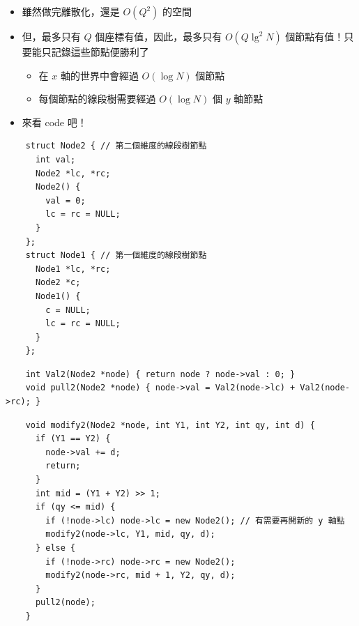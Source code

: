 \documentclass[standalone]{beamer}
\begin{document}
\begin{frame}[fragile]{}
  \begin{itemize}    
    \item 雖然做完離散化，還是 $O(Q^2)$ 的空間
    \item 但，最多只有 $Q$ 個座標有值，因此，最多只有 $O(Q \lg^2 N)$ 個節點有值！只要能只記錄這些節點便勝利了
    \begin{itemize}
      \item 在 $x$ 軸的世界中會經過 $O(\log N)$ 個節點
      \item 每個節點的線段樹需要經過 $O(\log N)$ 個 $y$ 軸節點
    \end{itemize}
    \item 來看 code 吧！
  \end{itemize}
\end{frame}

\begin{frame}[fragile]{}
  \begin{verbatim}
    struct Node2 { // 第二個維度的線段樹節點
      int val;
      Node2 *lc, *rc;
      Node2() {
        val = 0;
        lc = rc = NULL;
      }
    };
    struct Node1 { // 第一個維度的線段樹節點
      Node1 *lc, *rc;
      Node2 *c;
      Node1() {
        c = NULL;
        lc = rc = NULL;
      }
    };
  \end{verbatim}
\end{frame}

\begin{frame}[fragile]{}
  \begin{verbatim}
    int Val2(Node2 *node) { return node ? node->val : 0; }
    void pull2(Node2 *node) { node->val = Val2(node->lc) + Val2(node->rc); }
  \end{verbatim}
\end{frame}

\begin{frame}[fragile]{}
  \begin{verbatim}
    void modify2(Node2 *node, int Y1, int Y2, int qy, int d) {
      if (Y1 == Y2) {
        node->val += d;
        return;
      }
      int mid = (Y1 + Y2) >> 1;
      if (qy <= mid) {
        if (!node->lc) node->lc = new Node2(); // 有需要再開新的 y 軸點
        modify2(node->lc, Y1, mid, qy, d);
      } else {
        if (!node->rc) node->rc = new Node2();
        modify2(node->rc, mid + 1, Y2, qy, d);
      }
      pull2(node);
    }
  \end{verbatim}
\end{frame}
\end{document}
